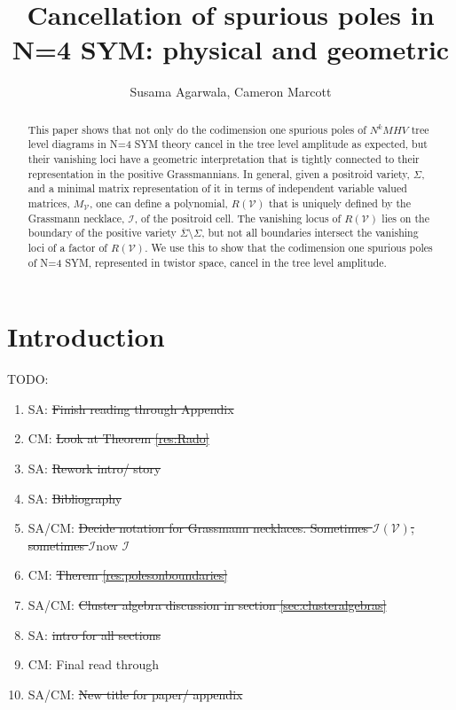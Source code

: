 \documentclass[11pt]{article}
\title{Cancellation of spurious poles in N=4 SYM: physical and geometric}
\author{Susama Agarwala, Cameron Marcott}
\newcommand{\cV}{\mathcal{V}}
\newcommand{\cI}{\mathcal{I}}
\theoremstyle{remark}
\theoremstyle{definition}
\begin{document}
\maketitle
\begin{abstract}
This paper shows that not only do the codimension one spurious poles of $N^k MHV$ tree level diagrams in N=4 SYM theory cancel in the tree level amplitude as expected, but their vanishing loci have a geometric interpretation that is tightly connected to their representation in the positive Grassmannians. In general, given a positroid variety, $\Sigma$, and a minimal matrix representation of it in terms of independent variable valued matrices, $M_\cV$, one can define a polynomial, $R(\cV)$ that is uniquely defined by the Grassmann necklace, $\cI$, of the positroid cell. The vanishing locus of $R(\cV)$ lies on the boundary of the positive variety $\overline{\Sigma} \setminus \Sigma$, but not all boundaries intersect the vanishing loci of a factor of $R(\cV)$. We use this to show that the codimension one spurious poles of  N=4 SYM, represented in twistor space, cancel in the tree level amplitude.
\end{abstract}
\section{Introduction}

TODO:
\begin{enumerate}
\item SA: \st{Finish reading through Appendix}
\item CM: \st{Look at Theorem {\ref{res:Rado}}}
\item SA: \st{Rework intro/ story}
\item SA: \st{Bibliography}
\item SA/CM: \st{Decide notation for Grassmann necklaces. Sometimes $\cI(\cV)$, sometimes $\cI$}now $\cI$
\item CM: \st{Therem {\ref{res:polesonboundaries}}}
\item SA/CM: \st{Cluster algebra discussion in section {\ref{sec:clusteralgebras}}}
\item SA: \st{intro for all sections}
\item CM: Final read through
\item SA/CM: \st{New title for paper/ appendix}

\end{enumerate}
\end{document}
